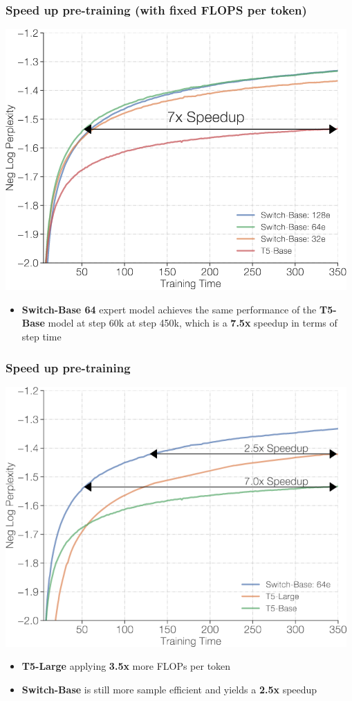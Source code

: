 \documentclass{beamer}
\begin{document}
\begin{frame}
    \frametitle{Speed up pre-training (with fixed FLOPS per token)}
    \begin{center}
        \includegraphics[scale=0.35]{img/switch_transformers_speedup.png}
    \end{center}
    \begin{itemize}
        \item \textbf{Switch-Base 64} expert model achieves the same performance of the \textbf{T5-Base} model at step 60k at step 450k, which is a \textbf{7.5x} speedup in terms of step time
    \end{itemize}
\end{frame}

\begin{frame}
    \frametitle{Speed up pre-training}
    \begin{center}
        \includegraphics[scale=0.36]{img/switch_transformers_speedup_2.png}
        \begin{itemize}
            \item \textbf{T5-Large} applying \textbf{3.5x} more FLOPs per token
            \item \textbf{Switch-Base} is still more sample efficient and yields a \textbf{2.5x} speedup
        \end{itemize}
    \end{center}
\end{frame}
\end{document}
